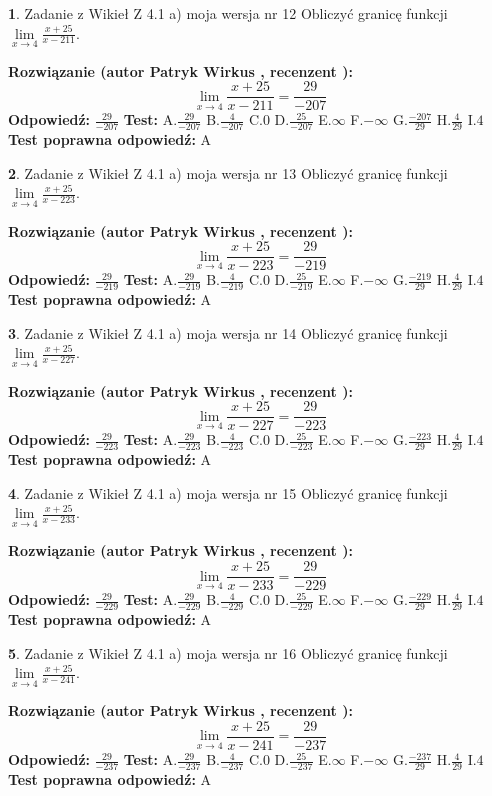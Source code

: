 \documentclass[12pt, a4paper]{article}
\theoremstyle{definition} %
\newtheorem{zad}{}
\newcommand{\zadStart}[1]{\begin{zad}#1\newline}
\newcommand{\zadStop}{\end{zad}}
\newcommand{\rozwStart}[2]{\noindent \textbf{Rozwiązanie (autor #1 , recenzent #2): }\newline}
\newcommand{\rozwStop}{\newline}
\newcommand{\odpStart}{\noindent \textbf{Odpowiedź:}\newline}
\newcommand{\odpStop}{\newline}
\newcommand{\testStart}{\noindent \textbf{Test:}\newline}
\newcommand{\testStop}{\newline}
\newcommand{\kluczStart}{\noindent \textbf{Test poprawna odpowiedź:}\newline}
\newcommand{\kluczStop}{\newline}
\begin{document}
\zadStart{Zadanie z Wikieł Z 4.1 a) moja wersja nr 12}
Obliczyć granicę funkcji $\lim\limits_{x\to4}\frac{x+25}{x-211}$.
\zadStop
\rozwStart{Patryk Wirkus}{}
$$\lim\limits_{x\to4}\frac{x+25}{x-211} = \frac{29}{-207}$$
\rozwStop
\odpStart
$\frac{29}{-207}$
\odpStop
\testStart
A.$\frac{29}{-207}$
B.$\frac{4}{-207}$
C.$0$
D.$\frac{25}{-207}$
E.$\infty$
F.$-\infty$
G.$\frac{-207}{29}$
H.$\frac{4}{29}$
I.$4$
\testStop
\kluczStart
A
\kluczStop



\zadStart{Zadanie z Wikieł Z 4.1 a) moja wersja nr 13}
Obliczyć granicę funkcji $\lim\limits_{x\to4}\frac{x+25}{x-223}$.
\zadStop
\rozwStart{Patryk Wirkus}{}
$$\lim\limits_{x\to4}\frac{x+25}{x-223} = \frac{29}{-219}$$
\rozwStop
\odpStart
$\frac{29}{-219}$
\odpStop
\testStart
A.$\frac{29}{-219}$
B.$\frac{4}{-219}$
C.$0$
D.$\frac{25}{-219}$
E.$\infty$
F.$-\infty$
G.$\frac{-219}{29}$
H.$\frac{4}{29}$
I.$4$
\testStop
\kluczStart
A
\kluczStop



\zadStart{Zadanie z Wikieł Z 4.1 a) moja wersja nr 14}
Obliczyć granicę funkcji $\lim\limits_{x\to4}\frac{x+25}{x-227}$.
\zadStop
\rozwStart{Patryk Wirkus}{}
$$\lim\limits_{x\to4}\frac{x+25}{x-227} = \frac{29}{-223}$$
\rozwStop
\odpStart
$\frac{29}{-223}$
\odpStop
\testStart
A.$\frac{29}{-223}$
B.$\frac{4}{-223}$
C.$0$
D.$\frac{25}{-223}$
E.$\infty$
F.$-\infty$
G.$\frac{-223}{29}$
H.$\frac{4}{29}$
I.$4$
\testStop
\kluczStart
A
\kluczStop



\zadStart{Zadanie z Wikieł Z 4.1 a) moja wersja nr 15}
Obliczyć granicę funkcji $\lim\limits_{x\to4}\frac{x+25}{x-233}$.
\zadStop
\rozwStart{Patryk Wirkus}{}
$$\lim\limits_{x\to4}\frac{x+25}{x-233} = \frac{29}{-229}$$
\rozwStop
\odpStart
$\frac{29}{-229}$
\odpStop
\testStart
A.$\frac{29}{-229}$
B.$\frac{4}{-229}$
C.$0$
D.$\frac{25}{-229}$
E.$\infty$
F.$-\infty$
G.$\frac{-229}{29}$
H.$\frac{4}{29}$
I.$4$
\testStop
\kluczStart
A
\kluczStop



\zadStart{Zadanie z Wikieł Z 4.1 a) moja wersja nr 16}
Obliczyć granicę funkcji $\lim\limits_{x\to4}\frac{x+25}{x-241}$.
\zadStop
\rozwStart{Patryk Wirkus}{}
$$\lim\limits_{x\to4}\frac{x+25}{x-241} = \frac{29}{-237}$$
\rozwStop
\odpStart
$\frac{29}{-237}$
\odpStop
\testStart
A.$\frac{29}{-237}$
B.$\frac{4}{-237}$
C.$0$
D.$\frac{25}{-237}$
E.$\infty$
F.$-\infty$
G.$\frac{-237}{29}$
H.$\frac{4}{29}$
I.$4$
\testStop
\kluczStart
A
\kluczStop
\end{document}
